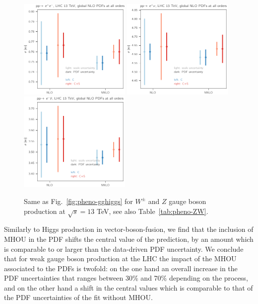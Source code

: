 \begin{figure}[t]
  \begin{center}
    \includegraphics[width=0.48\textwidth]{mhous/plots/z_13tev.pdf}
    \includegraphics[width=0.48\textwidth]{mhous/plots/wp_13tev.pdf}
    \includegraphics[width=0.48\textwidth]{mhous/plots/wm_13tev.pdf}
    \caption{\small Same as Fig.~\ref{fig:pheno-gghiggs}
    for $W^\pm$ and $Z$ gauge boson production
    at $\sqrt{s}=13$ TeV,
    see also Table~\ref{tab:pheno-ZW}.
    \label{fig:pheno-zw} }
  \end{center}
\end{figure}

Similarly to  Higgs production in vector-boson-fusion, we find that
the inclusion of MHOU in the PDF shifts the central value of the prediction, 
by an amount
which is comparable to or larger than the data-driven PDF uncertainty.
%
We  conclude that for weak gauge boson production at
the LHC the impact of the MHOU associated to the PDFs is twofold: on
the one hand an overall 
increase in the PDF uncertainties that ranges between 30\% and 70\% depending on the process,
and on the other hand a shift in the central values which is comparable to that
of the PDF uncertainties of the fit without MHOU.


